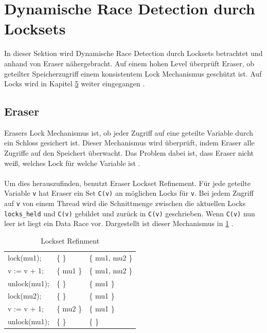 \section{Dynamische Race Detection durch Locksets}

In dieser Sektion wird Dynamische Race Detection durch Locksets betrachtet und anhand von Eraser nähergebracht. Auf einem hohen Level überprüft Eraser, ob geteilter Speicherzugriff einem konsistentem Lock Mechanismus geschützt ist. Auf Locks wird in Kapitel \hyperref[sec:loesen]{5} weiter eingegangen \cite[vgl.][392]{savage_eraser_nodate}.

\subsection*{Eraser}

Erasers Lock Mechanismus ist, ob jeder Zugriff auf eine geteilte Variable durch ein Schloss gesichert ist. Dieser Mechanismus wird überprüft, indem Eraser alle Zugriffe auf den Speichert überwacht. Das Problem dabei ist, dass Eraser nicht weiß, welches Lock für welche Variable ist \cite[vgl.][396]{savage_eraser_nodate}. \\
\\
Um dies herauszufinden, benutzt Eraser Lockset Refinement. Für jede geteilte Variable \texttt{v} hat Eraser ein Set \texttt{C(v)} an möglichen Locks für \texttt{v}. Bei jedem Zugriff auf \texttt{v} von einem Thread wird die Schnittmenge zwischen die aktuellen Locks \texttt{locks\_held} und \texttt{C(v)} gebildet und zurück in \texttt{C(v)} geschrieben. Wenn \texttt{C(v)} nun leer ist liegt ein Data Race vor. Dargestellt ist dieser Mechanismus in \ref{tab:locksetRefinment} \cite[vgl.][396-397]{savage_eraser_nodate}. 

\begin{table}[h]
    \myfloatalign
    \begin{tabularx}{\textwidth}{XXX} \toprule
        \tableheadline{Program} & \tableheadline{locks\_held}
        & \tableheadline{C(v)} \\ 
        \midrule
        lock(mu1); & \{ \} &  \{ mu1, mu2 \} \\
        v := v + 1; & \{ mu1 \} & \{ mu1, mu2 \} \\
        unlock(mu1); & \{ \} & \{ mu1 \} \\
        \midrule
        lock(mu2); & \{ \} & \{ mu1 \} \\
        v := v + 1; & \{ mu2 \} & \{ mu1 \} \\
        unlock(mu1); & \{ \} & \{ \} \\
        \bottomrule
    \end{tabularx}
    \caption[Lockset Refinment]{Lockset Refinment \cite[397]{savage_eraser_nodate}}
    \label{tab:locksetRefinment}
\end{table}

